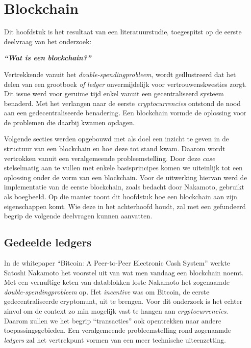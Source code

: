 \chapter{Blockchain}
\label{ch:blockchain}


Dit hoofdstuk is het resultaat van een literatuurstudie, toegespitst op de eerste deelvraag van het onderzoek:
\begin{center}
	\textit{\textbf{``Wat is een blockchain?''}}
\end{center}
Vertrekkende vanuit het \textit{double-spendingprobleem}, wordt geïllustreerd dat het delen van een grootboek \textit{of ledger} onvermijdelijk voor vertrouwenskwesties zorgt. Dit issue werd voor geruime tijd enkel vanuit een gecentraliseerd systeem benaderd. Met het verlangen naar de eerste \textit{cryptocurrencies} ontstond de nood aan een gedecentraliseerde benadering. Een blockchain vormde de oplossing voor de problemen die daarbij kwamen opdagen.

Volgende secties werden opgebouwd met als doel een inzicht te geven in de structuur van een blockchain en hoe deze tot stand kwam. Daarom wordt vertrokken vanuit een veralgemeende probleemstelling. Door deze \textit{case} stelselmatig aan te vullen met enkele basisprincipes komen we uiteinlijk tot een oplossing onder de vorm van een blockchain. Voor de uitwerking hiervan werd de implementatie van de eerste blockchain, zoals bedacht door Nakamoto, gebruikt als boegbeeld. Op die manier toont dit hoofdstuk hoe een blockchain aan zijn eigenschappen komt. Wie deze in het achterhoofd houdt, zal met een gefundeerd begrip de volgende deelvragen kunnen aanvatten.


\section{Gedeelde ledgers}
\label{sec:gedeelde-ledgers}
In de whitepaper ``Bitcoin: A Peer-to-Peer Electronic Cash System'' werkte Satoshi Nakamoto het voorstel uit van wat men vandaag een blockchain noemt. Met een vernuftige keten van datablokken loste Nakamoto het zogenaamde \textit{double-spendingprobleem} op. Het \textit{incentive} was om Bitcoin, de eerste gedecentraliseerde cryptomunt, uit te brengen. Voor dit onderzoek is het echter zinvol om de context zo min mogelijk vast te hangen aan \textit{cryptocurrencies}. Daarom zullen we het begrip ``transacties'' ook opentrekken naar andere toepassingsgebieden. Een veralgemeende probleemstelling rond zogenaamde \textit{ledgers} zal het vertrekpunt vormen van een meer technische uiteenzetting.


